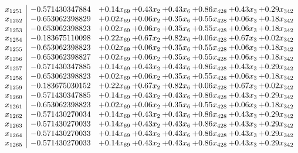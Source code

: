 \documentclass[8pt]{article}
\begin{document}
\[\begin{array}{c| c c@{\hskip 2pt} c@{\hskip 2pt} c@{\hskip 2pt} c@{\hskip 2pt} c@{\hskip 2pt} c@{\hskip 2pt} }
 x_{1251}   &  -0.571430347884 & +  0.14 x_{69} & +  0.43 x_{2} & +  0.43 x_{6} & +  0.86 x_{428} & +  0.43 x_{3} & +  0.29 x_{342}\\
 x_{1252}   &  -0.653062398829 & +  0.02 x_{69} & +  0.06 x_{2} & +  0.35 x_{6} & +  0.55 x_{428} & +  0.06 x_{3} & +  0.18 x_{342}\\
 x_{1253}   &  -0.653062398823 & +  0.02 x_{69} & +  0.06 x_{2} & +  0.35 x_{6} & +  0.55 x_{428} & +  0.06 x_{3} & +  0.18 x_{342}\\
 x_{1254}   &  -0.183675110098 & +  0.22 x_{69} & +  0.67 x_{2} & +  0.82 x_{6} & +  0.06 x_{428} & +  0.67 x_{3} & +  0.02 x_{342}\\
 x_{1255}   &  -0.653062398823 & +  0.02 x_{69} & +  0.06 x_{2} & +  0.35 x_{6} & +  0.55 x_{428} & +  0.06 x_{3} & +  0.18 x_{342}\\
 x_{1256}   &  -0.653062398827 & +  0.02 x_{69} & +  0.06 x_{2} & +  0.35 x_{6} & +  0.55 x_{428} & +  0.06 x_{3} & +  0.18 x_{342}\\
 x_{1257}   &  -0.571430347885 & +  0.14 x_{69} & +  0.43 x_{2} & +  0.43 x_{6} & +  0.86 x_{428} & +  0.43 x_{3} & +  0.29 x_{342}\\
 x_{1258}   &  -0.653062398823 & +  0.02 x_{69} & +  0.06 x_{2} & +  0.35 x_{6} & +  0.55 x_{428} & +  0.06 x_{3} & +  0.18 x_{342}\\
 x_{1259}   &  -0.183675030152 & +  0.22 x_{69} & +  0.67 x_{2} & +  0.82 x_{6} & +  0.06 x_{428} & +  0.67 x_{3} & +  0.02 x_{342}\\
 x_{1260}   &  -0.571430347885 & +  0.14 x_{69} & +  0.43 x_{2} & +  0.43 x_{6} & +  0.86 x_{428} & +  0.43 x_{3} & +  0.29 x_{342}\\
 x_{1261}   &  -0.653062398823 & +  0.02 x_{69} & +  0.06 x_{2} & +  0.35 x_{6} & +  0.55 x_{428} & +  0.06 x_{3} & +  0.18 x_{342}\\
 x_{1262}   &  -0.571430270034 & +  0.14 x_{69} & +  0.43 x_{2} & +  0.43 x_{6} & +  0.86 x_{428} & +  0.43 x_{3} & +  0.29 x_{342}\\
 x_{1263}   &  -0.571430270033 & +  0.14 x_{69} & +  0.43 x_{2} & +  0.43 x_{6} & +  0.86 x_{428} & +  0.43 x_{3} & +  0.29 x_{342}\\
 x_{1264}   &  -0.571430270033 & +  0.14 x_{69} & +  0.43 x_{2} & +  0.43 x_{6} & +  0.86 x_{428} & +  0.43 x_{3} & +  0.29 x_{342}\\
 x_{1265}   &  -0.571430270033 & +  0.14 x_{69} & +  0.43 x_{2} & +  0.43 x_{6} & +  0.86 x_{428} & +  0.43 x_{3} & +  0.29 x_{342}\\

\end{array}\]
\end{document}
